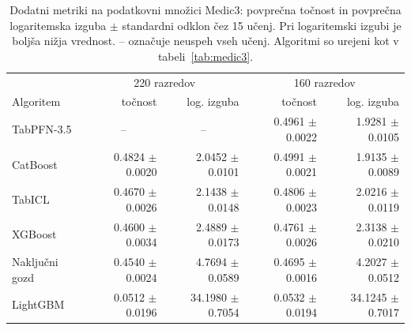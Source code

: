 \begin{table}[H]
\centering
\caption{Dodatni metriki na podatkovni množici Medic3: povprečna točnost in povprečna logaritemska izguba $\pm$ standardni odklon čez 15 učenj. Pri logaritemski izgubi je boljša nižja vrednost. -- označuje neuspeh vseh učenj. Algoritmi so urejeni kot v tabeli~\ref{tab:medic3}.}
\label{tab:medic3-metrike}
\footnotesize
\setlength{\tabcolsep}{3pt}
\begin{tabular}{lrrrr}
\hline
 & \multicolumn{2}{c}{220 razredov} & \multicolumn{2}{c}{160 razredov} \\
Algoritem & točnost & log. izguba & točnost & log. izguba \\
\hline
TabPFN-3.5 & \multicolumn{1}{c}{--} & \multicolumn{1}{c}{--} & \num{0.4961} $\pm$ \num{0.0022} & \num{1.9281} $\pm$ \num{0.0105} \\
CatBoost & \num{0.4824} $\pm$ \num{0.0020} & \num{2.0452} $\pm$ \num{0.0101} & \num{0.4991} $\pm$ \num{0.0021} & \num{1.9135} $\pm$ \num{0.0089} \\
TabICL & \num{0.4670} $\pm$ \num{0.0026} & \num{2.1438} $\pm$ \num{0.0148} & \num{0.4806} $\pm$ \num{0.0023} & \num{2.0216} $\pm$ \num{0.0119} \\
XGBoost & \num{0.4600} $\pm$ \num{0.0034} & \num{2.4889} $\pm$ \num{0.0173} & \num{0.4761} $\pm$ \num{0.0026} & \num{2.3138} $\pm$ \num{0.0210} \\
Naključni gozd & \num{0.4540} $\pm$ \num{0.0024} & \num{4.7694} $\pm$ \num{0.0589} & \num{0.4695} $\pm$ \num{0.0016} & \num{4.2027} $\pm$ \num{0.0512} \\
LightGBM & \num{0.0512} $\pm$ \num{0.0196} & \num{34.1980} $\pm$ \num{0.7054} & \num{0.0532} $\pm$ \num{0.0194} & \num{34.1245} $\pm$ \num{0.7017} \\
\hline
\end{tabular}
\end{table}
